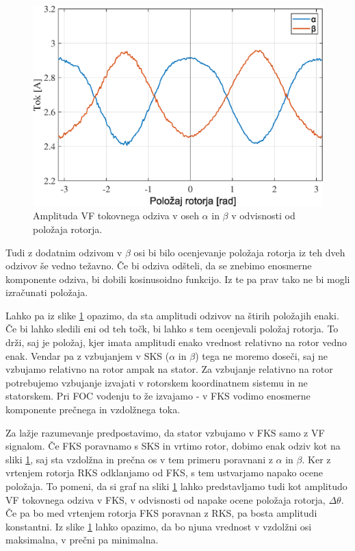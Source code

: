 \documentclass[a4paper,twoside,openright,12pt,slovene]{book}
\begin{document}
\begin{figure}[!htbp]
    \centering
    \includegraphics[width=0.9\columnwidth]{Slike/tokovniOdzivAlphaBeta.eps}
    \caption{\label{tokovniOdzivAlphaBeta} Amplituda VF tokovnega odziva v oseh $\alpha$ in $\beta$ v odvisnosti od položaja rotorja.}
\end{figure}

Tudi z dodatnim odzivom v $\beta$ osi bi bilo ocenjevanje položaja rotorja iz teh dveh odzivov še vedno težavno. Če bi odziva odšteli, da se znebimo enosmerne komponente odziva, bi dobili kosinusoidno
funkcijo. Iz te pa prav tako ne bi mogli izračunati položaja. 

Lahko pa iz slike \ref{tokovniOdzivAlphaBeta} opazimo, da sta amplitudi odzivov na štirih položajih enaki. Če bi lahko sledili eni od teh točk, bi lahko s tem ocenjevali položaj rotorja. To drži, saj
je položaj, kjer imata amplitudi enako vrednost relativno na rotor vedno enak. Vendar pa z vzbujanjem v SKS ($\alpha$ in $\beta$) tega ne moremo doseči, saj ne vzbujamo relativno na rotor ampak na
stator. Za vzbujanje relativno na rotor potrebujemo vzbujanje izvajati v rotorskem koordinatnem sistemu in ne statorskem. Pri FOC vodenju to že izvajamo - v FKS vodimo enosmerne komponente prečnega in
vzdolžnega toka. 

Za lažje razumevanje predpostavimo, da stator vzbujamo v FKS samo z VF signalom. Če FKS poravnamo s SKS in vrtimo rotor, dobimo enak odziv kot na sliki \ref{tokovniOdzivAlphaBeta}, saj sta vzdolžna in
prečna os v tem primeru poravnani z $\alpha$ in $\beta$. Ker z vrtenjem rotorja RKS odklanjamo od FKS, s tem ustvarjamo napako ocene položaja. To pomeni, da si graf na sliki
\ref{tokovniOdzivAlphaBeta} lahko predstavljamo tudi kot amplitudo VF tokovnega odziva v FKS, v odvisnosti od napake ocene položaja rotorja, $\Delta\theta$. Če pa bo med vrtenjem rotorja FKS poravnan
z RKS, pa bosta amplitudi konstantni. Iz slike \ref{tokovniOdzivAlphaBeta} lahko opazimo, da bo njuna vrednost v vzdolžni osi maksimalna, v prečni pa minimalna. 
\end{document}
